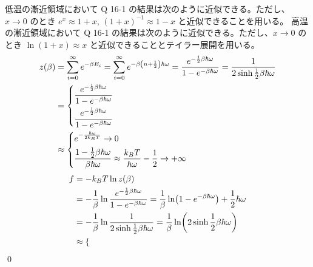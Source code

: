 \documentclass[uplatex,dvipdfmx,a4paper,11pt]{jlreq}
\makeatletter
\theoremstyle{definition}
\renewenvironment{proof}[1][\proofname]{\par
  \normalfont
  \topsep6\p@\@plus6\p@ \trivlist
  \item[\hskip\labelsep{\bfseries #1}\@addpunct{\bfseries}]\ignorespaces\quad\par
}{%
  \qed\endtrivlist\@endpefalse
}
\renewcommand\proofname{証明}
\makeatother
\begin{document}
\begin{proof}
  低温の漸近領域において Q 16-1 の結果は次のように近似できる。ただし、$x\to 0$ のとき $e^x \approx 1 + x$, $(1 + x)^{-1} \approx 1 - x$ と近似できることを用いる。
  高温の漸近領域において Q 16-1 の結果は次のように近似できる。ただし、$x\to 0$ のとき $\ln(1 + x) \approx x$ と近似できることとテイラー展開を用いる。
  \begin{align}
    z(\beta) & = \sum_{i = 0}^{\infty}e^{-\beta E_i} = \sum_{i = 0}^{\infty}e^{-\beta\qty(n + \frac{1}{2})\hbar\omega} = \frac{e^{-\frac{1}{2}\beta\hbar\omega}}{1 - e^{-\beta\hbar\omega}} = \frac{1}{2\sinh \frac{1}{2}\beta\hbar\omega} \\
             & = \begin{dcases}
                   \frac{e^{-\frac{1}{2}\beta\hbar\omega}}{1 - e^{-\beta\hbar\omega}} \\
                   \frac{e^{-\frac{1}{2}\beta\hbar\omega}}{1 - e^{-\beta\hbar\omega}} \\
                 \end{dcases}                                                                                                                                                 \\
             & \approx \begin{dcases}
                         e^{-\frac{\hbar\omega}{2k_BT}} \to 0                                                                                \\
                         \frac{1 - \frac{1}{2}\beta\hbar\omega}{\beta\hbar\omega} \approx \frac{k_BT}{\hbar\omega} - \frac{1}{2} \to +\infty \\
                       \end{dcases}
  \end{align}
  \begin{align}
    f & = -k_BT\ln z(\beta)                                                                                                                                               \\
      & = -\frac{1}{\beta}\ln \frac{e^{-\frac{1}{2}\beta\hbar\omega}}{1 - e^{-\beta\hbar\omega}} = \frac{1}{\beta}\ln(1 - e^{-\beta\hbar\omega}) + \frac{1}{2}\hbar\omega \\
      & = -\frac{1}{\beta}\ln \frac{1}{2\sinh \frac{1}{2}\beta\hbar\omega} = \frac{1}{\beta}\ln(2\sinh \frac{1}{2}\beta\hbar\omega)                                       \\
      & \approx \begin{dcases}

\end{dcases}
\end{align}
\end{proof}
\end{document}
